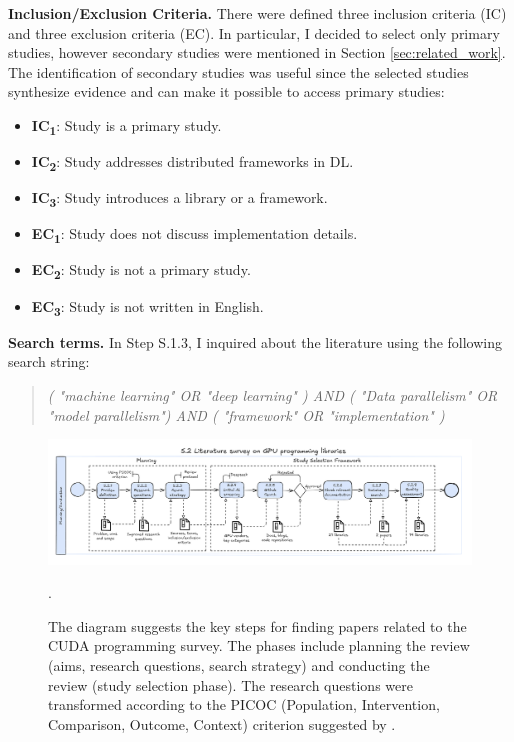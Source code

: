 \textbf{Inclusion/Exclusion Criteria.}
There were defined three inclusion criteria (IC) and three exclusion criteria (EC). In particular, I
decided to select only primary studies, however secondary studies were mentioned in Section
\ref{sec:related_work}. The identification of secondary studies was useful since the selected
studies synthesize evidence and can make it possible to access primary studies:

\begin{itemize}
	\item \textbf{IC\textsubscript{1}}: Study is a primary study.
	\item \textbf{IC\textsubscript{2}}: Study addresses distributed frameworks in DL.
	\item \textbf{IC\textsubscript{3}}: Study introduces a library or a framework. \\
	\item \textbf{EC\textsubscript{1}}: Study does not discuss implementation details.
	\item \textbf{EC\textsubscript{2}}: Study is not a primary study.
	\item \textbf{EC\textsubscript{3}}: Study is not written in English.
\end{itemize}

\textbf{Search terms.}
In Step S.1.3, I inquired about the literature using the following search string:
\begin{quote}
	\textit{( "machine learning" OR "deep learning" )
		AND
		( "Data parallelism" OR "model parallelism")
		AND
		( "framework" OR "implementation" )}
\end{quote}

\begin{figure}[th]
	\centering
	\includegraphics[width=\linewidth]{figures/survey-cuda3.pdf}
	\caption{The diagram suggests the key steps for finding papers related to the CUDA programming survey. The phases
		include planning the review (aims, research questions, search strategy) and conducting the review (study selection phase). The research questions
		were transformed according to the PICOC (Population, Intervention, Comparison, Outcome, Context) criterion suggested by \cite{keele_systematic_2007}.}.
	\label{fig:workflow-study-dnn}
\end{figure}

